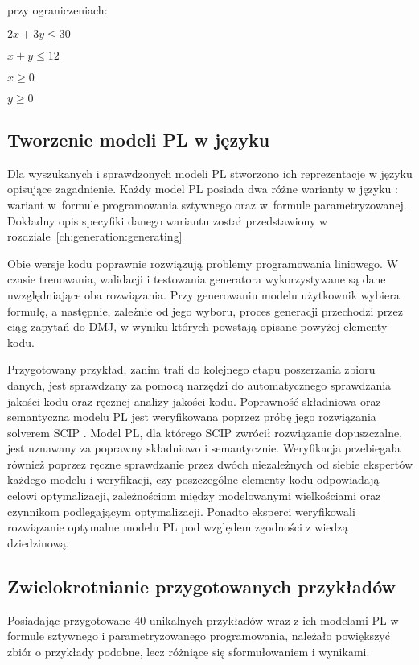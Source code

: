 przy ograniczeniach:

    $2x + 3y \leq 30$
    
    $x + y \leq 12$
    
    $x  \geq 0$
    
    $y \geq 0$


\subsection{Tworzenie modeli PL w języku }

Dla wyszukanych i sprawdzonych modeli PL stworzono ich reprezentacje w języku  opisujące zagadnienie.
Każdy model PL posiada dwa różne warianty w języku  : wariant w~formule programowania sztywnego oraz w~formule parametryzowanej. Dokładny opis specyfiki danego wariantu został przedstawiony w rozdziale~\ref{ch:generation:generating}

Obie wersje kodu poprawnie rozwiązują problemy programowania liniowego. W czasie trenowania, walidacji i testowania generatora wykorzystywane są dane uwzględniające oba rozwiązania. Przy generowaniu modelu  użytkownik wybiera formułę, a następnie, zależnie od jego wyboru, proces generacji przechodzi przez ciąg zapytań do DMJ, w wyniku których powstają opisane powyżej elementy kodu. 

Przygotowany przykład, zanim trafi do kolejnego etapu poszerzania zbioru danych, jest sprawdzany za pomocą narzędzi do automatycznego sprawdzania jakości kodu oraz ręcznej analizy jakości kodu. Poprawność składniowa oraz semantyczna modelu PL jest weryfikowana poprzez próbę jego rozwiązania solverem SCIP \cite{BolusaniEtal2024ZR}. Model PL, dla którego SCIP zwrócił rozwiązanie dopuszczalne, jest uznawany za poprawny składniowo i semantycznie. Weryfikacja przebiegała również poprzez ręczne sprawdzanie przez dwóch niezależnych od siebie ekspertów każdego modelu i weryfikacji, czy poszczególne elementy kodu odpowiadają celowi optymalizacji, zależnościom między modelowanymi wielkościami oraz czynnikom podlegającym optymalizacji. Ponadto eksperci weryfikowali rozwiązanie optymalne modelu PL pod względem zgodności z wiedzą dziedzinową.

\subsection{Zwielokrotnianie przygotowanych przykładów}

Posiadając przygotowane 40 unikalnych przykładów wraz z ich modelami PL w formule sztywnego i parametryzowanego programowania, należało powiększyć zbiór o przykłady podobne, lecz różniące się sformułowaniem i wynikami.

